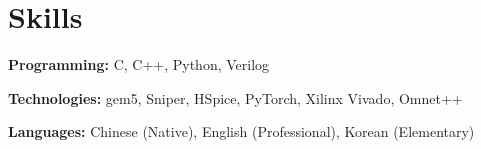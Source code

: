 \documentclass[letterpaper,11pt]{article}
\newcommand{\resumeSubHeadingListStart}{\begin{itemize}[leftmargin=0.15in, label={}]}
\newcommand{\resumeSubHeadingListEnd}{\end{itemize}}
\begin{document}
\section{Skills}
  \vspace{2pt}
  \resumeSubHeadingListStart
    \small{\item{
        \textbf{Programming:}{ C, C++, Python, Verilog} \\ \vspace{3pt}
        
        \textbf{Technologies:}{ gem5, Sniper, HSpice, PyTorch, Xilinx Vivado, Omnet++} \\ \vspace{3pt}
        
        \textbf{Languages:}{ Chinese (Native), English (Professional), Korean (Elementary)}
        
    }}
  \resumeSubHeadingListEnd




        




    
\end{document}
